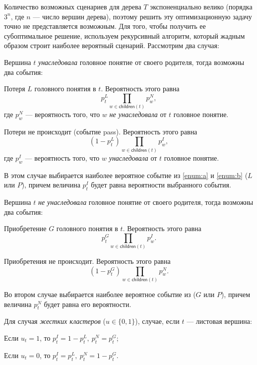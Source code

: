 \documentclass[12pt]{article}
\newenvironment{enumerate*}%
{\begin{enumerate}%
	\setlength{\itemsep}{0pt}%
	\setlength{\parskip}{0pt}}%
{\end{enumerate}}
\newenvironment{alphaenumerate*}
{\begin{enumerate}[label=(\asbuk*), ref=(\asbuk*)]
	\setlength{\itemsep}{0pt}
	\setlength{\parskip}{0pt}}
{\end{enumerate}}
\newcommand{\children}[1] {\textsf{children}(#1)}
\begin{document}
Количество возможных сценариев для дерева $T$ экспоненциально велико (порядка $3^n$, где $n$ --- число вершин дерева), поэтому решить эту оптимизационную задачу точно не представляется возможным. Для того, чтобы получить ее субоптимальное решение, используем рекурсивный алгоритм, который жадным образом строит наиболее вероятный сценарий. Рассмотрим два случая:
\begin{enumerate*}
	\item Вершина $t$ \emph{унаследовала} головное понятие от своего родителя, тогда возможны два события:
	\begin{alphaenumerate*}
		\item\label{enum:a} Потеря $L$ головного понятия в $t$. Вероятность этого равна $$p_t^L\prod_{w\in\children{t}}p_w^N,$$ где $p_w^N$ --- вероятность того, что $w$ \emph{не унаследовала} от $t$ головное понятие.
		\item\label{enum:b} Потери не происходит (событие pass). Вероятность этого равна $$(1-p_t^L)\prod_{w\in\children{t}}p_w^I,$$ где $p_w^I$ --- вероятность того, что $w$ \emph{унаследовала} от $t$ головное понятие.
	\end{alphaenumerate*}
	В этом случае выбирается наиболее вероятное событие из \ref{enum:a} и \ref{enum:b} ($L$ или $P$), причем величина $p_t^I$ будет равна вероятности выбранного события.
	\item Вершина $t$ \emph{не унаследовала} головное понятие от своего родителя, тогда возможны два события:
	\begin{alphaenumerate*}
		\item Приобретение $G$ головного понятия в $t$. Вероятность этого равна $$p_t^G \prod_{w\in\children{t}}p_w^I.$$
		\item Приобретения не происходит. Вероятность этого равна $$(1-p_t^G) \prod_{w\in\children{t}}p_w^N.$$
	\end{alphaenumerate*}
	Во втором случае выбирается наиболее вероятное событие из ($G$ или $P$), причем величина $p_t^N$ будет равна его вероятности.
\end{enumerate*}

Для случая \emph{жестких кластеров} ($u\in\{0, 1\}$), случае, если $t$ --- листовая вершина:
\begin{enumerate*}
	\item Если $u_t = 1$, то $p_t^I=1-p_t^L, \ p_t^N=p_t^G$;
	\item Если $u_t = 0$, то $p_t^I=p_t^L, \ p_t^N=1-p_t^G$.
 \end{enumerate*}
\end{document}

